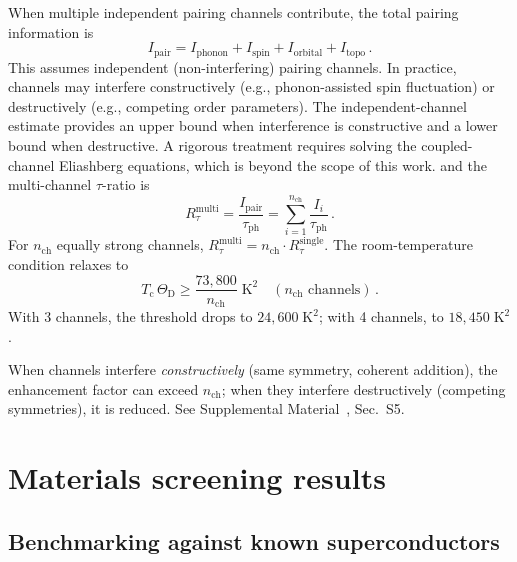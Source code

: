 \documentclass[prb,twocolumn,superscriptaddress,longbibliography,floatfix]{revtex4-2}
\newcommand{\tauasym}{\tau}
\newcommand{\taudec}{\tauasym_{\mathrm{ph}}}
\newcommand{\Ipair}{I_{\mathrm{pair}}}
\newcommand{\Rtau}{R_{\tauasym}}
\newcommand{\Tc}{T_{\mathrm{c}}}
\newcommand{\ThetaD}{\Theta_{\mathrm{D}}}
\begin{document}
When multiple independent pairing channels contribute,
the total pairing information is~\cite{supplement}
\begin{equation}\label{eq:Ipair_multi}
  \Ipair = I_{\mathrm{phonon}} + I_{\mathrm{spin}}
  + I_{\mathrm{orbital}} + I_{\mathrm{topo}}\,.
\end{equation}
This assumes independent (non-interfering) pairing channels.
In practice, channels may interfere constructively (e.g.,
phonon-assisted spin fluctuation) or destructively (e.g.,
competing order parameters).  The independent-channel estimate
provides an upper bound when interference is constructive and
a lower bound when destructive.  A rigorous treatment requires
solving the coupled-channel Eliashberg equations, which is
beyond the scope of this work.
and the multi-channel $\tauasym$-ratio is
\begin{equation}\label{eq:Rtau_multi}
  \Rtau^{\mathrm{multi}} = \frac{\Ipair}{\taudec}
  = \sum_{i=1}^{n_{\mathrm{ch}}} \frac{I_i}{\taudec}\,.
\end{equation}
For $n_{\mathrm{ch}}$ equally strong channels,
$\Rtau^{\mathrm{multi}} = n_{\mathrm{ch}} \cdot \Rtau^{\mathrm{single}}$.
The room-temperature condition relaxes to
\begin{equation}\label{eq:RT_multi}
  \Tc\, \ThetaD \geq \frac{73{,}800}{n_{\mathrm{ch}}}\;\mathrm{K}^2
  \quad (n_{\mathrm{ch}} \text{ channels})\,.
\end{equation}
With 3 channels, the threshold drops to $24{,}600\;\mathrm{K}^2$;
with 4 channels, to $18{,}450\;\mathrm{K}^2$.

When channels interfere \emph{constructively} (same symmetry,
coherent addition), the enhancement factor can exceed
$n_{\mathrm{ch}}$; when they interfere destructively (competing
symmetries), it is reduced.  See Supplemental
Material~\cite{supplement}, Sec.~S5.

\section{Materials screening results}
\label{sec:screening}

\subsection{Benchmarking against known superconductors}
\end{document}
